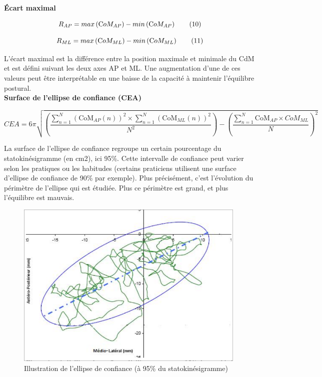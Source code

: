 \textbf{Écart maximal}


\[
R_{AP}= max \left ( \text CoM_{AP} \right ) - min\left ( \text CoM_{AP} \right ) \tag{10}
\]


\[R_{ML}= max \left ( \text CoM_{ML} \right ) - min\left ( \text CoM_{ML} \right ) \tag{11}
\]

L'écart maximal est la différence entre la position maximale et minimale du CdM et est défini suivant les deux axes AP et ML. 
Une augmentation d'une de ces valeurs peut être interprétable en une baisse de la capacité à maintenir l'équilibre postural.\\

\textbf{Surface de l'ellipse de confiance (CEA)}

\[
CEA= 6\pi \sqrt{ \left ( \frac{\sum_{n=1}^{N} \left (\text{CoM}_{AP}(n) \right)^2 \times \sum_{n=1}^{N} \left ( \text{CoM}_{ML}(n) \right)^2}{N^2} \right ) - \left (\frac{\sum_{n=1}^N \text{CoM}_{AP} \times CoM_{ML}}{N} \right)^2} \tag{12}
\]

La surface de l'ellipse de confiance regroupe un certain pourcentage du statokinésigramme (en cm2), ici 95\%. 
Cette intervalle de confiance peut varier selon les pratiques ou les habitudes (certains praticiens utilisent une surface d'ellipse de confiance de 90\% par exemple). 
Plus précisément, c'est l'évolution du périmètre de l'ellipse qui est étudiée. 
Plus ce périmètre est grand, et plus l'équilibre est mauvais.

\begin{figure}[H]
    \centering
    \includegraphics[height=8cm]{images/methode/ellipse_confiance_95.png}
    \caption{Illustration de l'ellipse de confiance (à 95\% du statokinésigramme)}\label{fig:ellipse_confiance}
\end{figure}

